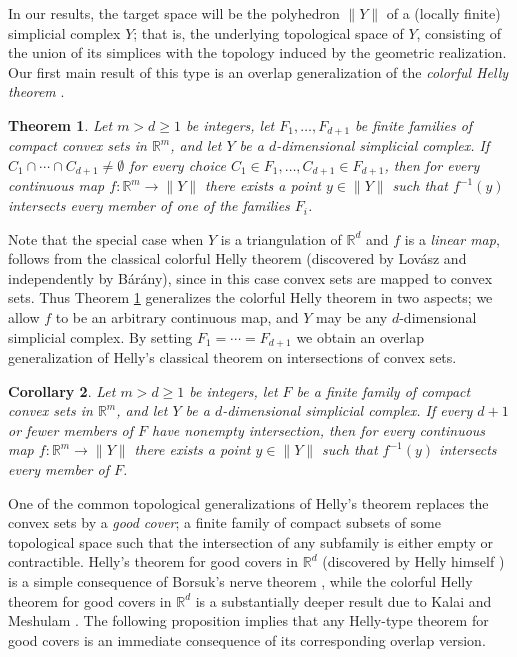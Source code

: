 \documentclass[12pt,a4paper,oneside]{amsart}\sloppy
\newtheorem{theorem}{Theorem}%
\newtheorem{corollary}[theorem]{Corollary}
\theoremstyle{definition}
\begin{document}
In our results, the target space will be the polyhedron $\|Y\|$ of a (locally finite) simplicial complex $Y$; that is, the underlying topological space of $Y$, consisting of the union of its simplices with the topology induced by the geometric realization.
Our first main result of this type is an overlap generalization of the \emph{colorful Helly theorem} \cite{col-hell}. 

\begin{theorem}\label{thm:convex version}
Let $m >  d\geq 1$ be integers, let $F_1, \dots, F_{d+1}$ be finite families of compact convex sets in $\mathbb{R}^m$, and let $Y$ be a $d$-dimensional simplicial complex. If $C_1\cap \cdots \cap C_{d+1}\neq\emptyset$ for every choice $C_1\in F_1, \dots, C_{d+1}\in F_{d+1}$, then for every continuous map $f \colon \mathbb{R}^m \to \|Y\|$ there exists a point $y\in \|Y\|$ such that $f^{-1}(y)$ intersects every member of one of the families $F_i$.
\end{theorem}

Note that the special case when $Y$ is a triangulation of $\mathbb{R}^d$ and $f$ is a \emph{linear map}, follows from the classical colorful Helly theorem  \cite{col-hell} (discovered by Lov{\'a}sz and independently by B{\'a}r{\'a}ny), since in this case convex sets are mapped to convex sets. Thus Theorem \ref{thm:convex version} generalizes the colorful Helly theorem in two aspects; we allow $f$ to be an arbitrary continuous map, and $Y$ may be any $d$-dimensional simplicial complex. By setting $F_1 = \cdots = F_{d+1}$ we obtain an overlap generalization of Helly's classical theorem on intersections of convex sets. 

\begin{corollary}\label{cor:just helly}
Let $m >  d\geq 1$ be integers, let $F$ be a finite family of compact convex sets in $\mathbb{R}^m$, and let $Y$ be a $d$-dimensional simplicial complex. If every $d+1$ or fewer members of $F$ have nonempty intersection, then for every continuous map $f \colon \mathbb{R}^m \to \|Y\|$ there exists a point $y\in \|Y\|$ such that $f^{-1}(y)$ intersects every member of $F$.
\end{corollary}

One of the common topological generalizations of Helly's theorem replaces the convex sets by a \emph{good cover}; a finite family of compact subsets of some topological space such that the intersection of any subfamily is either empty or contractible. Helly's theorem for good covers in $\mathbb{R}^d$ (discovered by Helly himself \cite{Helly1930}) is a simple consequence of Borsuk's nerve theorem \cite{Borsuk1948}, while the colorful Helly theorem for good covers in $\mathbb{R}^d$ is a substantially deeper result due to Kalai and Meshulam \cite{KM}. The following proposition implies that any Helly-type theorem for good covers is an immediate consequence of its corresponding overlap version.
\end{document}
